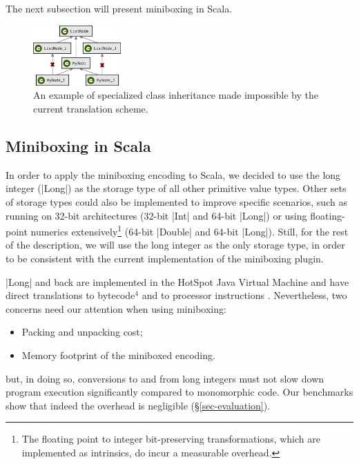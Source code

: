 The next subsection will present miniboxing in Scala.

\begin{figure}[t]
    \centering
    \includegraphics[width=0.30\textwidth]{diags/spec-multi.eps}
    \caption{An example of specialized class inheritance made impossible by the current translation scheme.}
    \label{fig-spec-multi}
    \vspace{-3mm}
\end{figure}

\subsection{Miniboxing in Scala}

In order to apply the miniboxing encoding to Scala, we decided to use the long integer (|Long|) as the storage type of all other primitive value types. Other sets of storage types could also be implemented to improve specific scenarios, such as running on 32-bit architectures (32-bit |Int| and 64-bit |Long|) or using floating-point numerics extensively\footnote{The floating point to integer bit-preserving transformations, which are implemented as intrinsics, do incur a measurable overhead.} (64-bit |Double| and 64-bit |Long|). Still, for the rest of the description, we will use the long integer as the only storage type, in order to be consistent with the current implementation of the miniboxing plugin.

 |Long| and back are implemented in the HotSpot Java Virtual Machine and have direct translations to bytecode$^\text{4}$ and to processor instructions \cite{intel-ia-32-instruction-reference}. Nevertheless, two concerns need our attention when using miniboxing: %
\begin{itemize}
\item Packing and unpacking cost;
\item Memory footprint of the miniboxed encoding.
\end{itemize}

 but, in doing so, conversions to and from long integers must not slow down program execution significantly compared to monomorphic code. Our benchmarks show that indeed the overhead is negligible (\S{}\ref{sec-evaluation}).

